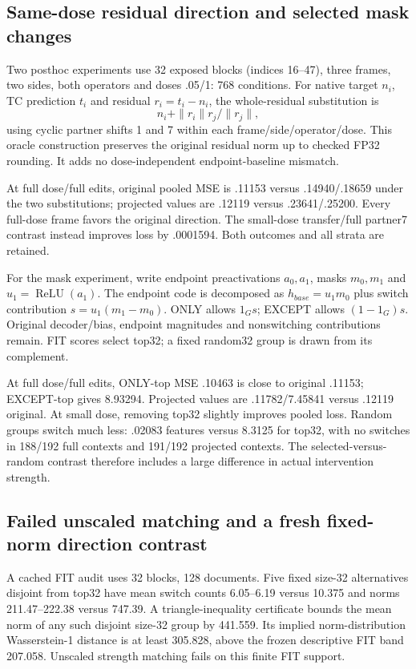 \documentclass[11pt]{article}
\begin{document}
\subsection{Same-dose residual direction and selected mask changes}
Two posthoc experiments use 32 exposed blocks (indices 16--47), three frames, two sides, both operators and doses .05/1: 768 conditions. For native target $n_i$, TC prediction $t_i$ and residual $r_i=t_i-n_i$, the whole-residual substitution is
\[
 n_i+\|r_i\|r_j/\|r_j\|,
\]
using cyclic partner shifts 1 and 7 within each frame/side/operator/dose. This oracle construction preserves the original residual norm up to checked FP32 rounding. It adds no dose-independent endpoint-baseline mismatch.

At full dose/full edits, original pooled MSE is .11153 versus .14940/.18659 under the two substitutions; projected values are .12119 versus .23641/.25200. Every full-dose frame favors the original direction. The small-dose transfer/full partner7 contrast instead improves loss by .0001594. Both outcomes and all strata are retained.

For the mask experiment, write endpoint preactivations $a_0,a_1$, masks $m_0,m_1$ and $u_1=\operatorname{ReLU}(a_1)$. The endpoint code is decomposed as $h_{base}=u_1m_0$ plus switch contribution $s=u_1(m_1-m_0)$. ONLY allows $1_Gs$; EXCEPT allows $(1-1_G)s$. Original decoder/bias, endpoint magnitudes and nonswitching contributions remain. FIT scores select top32; a fixed random32 group is drawn from its complement.

At full dose/full edits, ONLY-top MSE .10463 is close to original .11153; EXCEPT-top gives 8.93294. Projected values are .11782/7.45841 versus .12119 original. At small dose, removing top32 slightly improves pooled loss. Random groups switch much less: .02083 features versus 8.3125 for top32, with no switches in 188/192 full contexts and 191/192 projected contexts. The selected-versus-random contrast therefore includes a large difference in actual intervention strength.

\subsection{Failed unscaled matching and a fresh fixed-norm direction contrast}
A cached FIT audit uses 32 blocks, 128 documents. Five fixed size-32 alternatives disjoint from top32 have mean switch counts 6.05--6.19 versus 10.375 and norms 211.47--222.38 versus 747.39. A triangle-inequality certificate bounds the mean norm of any such disjoint size-32 group by 441.559. Its implied norm-distribution Wasserstein-1 distance is at least 305.828, above the frozen descriptive FIT band 207.058. Unscaled strength matching fails on this finite FIT support.
\end{document}
